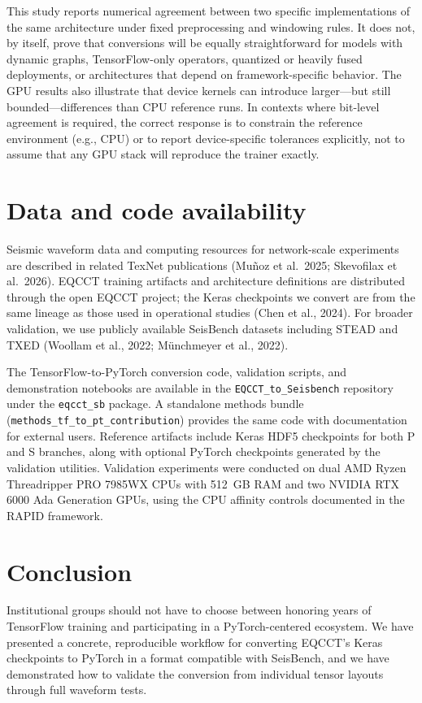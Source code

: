 This study reports numerical agreement between two specific implementations of the same architecture under fixed preprocessing and windowing rules. It does not, by itself, prove that conversions will be equally straightforward for models with dynamic graphs, TensorFlow-only operators, quantized or heavily fused deployments, or architectures that depend on framework-specific behavior. The GPU results also illustrate that device kernels can introduce larger---but still bounded---differences than CPU reference runs. In contexts where bit-level agreement is required, the correct response is to constrain the reference environment (e.g., CPU) or to report device-specific tolerances explicitly, not to assume that any GPU stack will reproduce the trainer exactly.

\section{Data and code availability}

Seismic waveform data and computing resources for network-scale experiments are described in related TexNet publications (Muñoz et al.\ 2025; Skevofilax et al.\ 2026). EQCCT training artifacts and architecture definitions are distributed through the open EQCCT project; the Keras checkpoints we convert are from the same lineage as those used in operational studies (Chen et al., 2024). For broader validation, we use publicly available SeisBench datasets including STEAD and TXED (Woollam et al., 2022; Münchmeyer et al., 2022).

The TensorFlow-to-PyTorch conversion code, validation scripts, and demonstration notebooks are available in the \texttt{EQCCT\_to\_Seisbench} repository under the \texttt{eqcct\_sb} package. A standalone methods bundle (\texttt{methods\_tf\_to\_pt\_contribution}) provides the same code with documentation for external users. Reference artifacts include Keras HDF5 checkpoints for both P and S branches, along with optional PyTorch checkpoints generated by the validation utilities. Validation experiments were conducted on dual AMD Ryzen Threadripper PRO 7985WX CPUs with 512~GB RAM and two NVIDIA RTX 6000 Ada Generation GPUs, using the CPU affinity controls documented in the RAPID framework.

\section{Conclusion}

Institutional groups should not have to choose between honoring years of TensorFlow training and participating in a PyTorch-centered ecosystem. We have presented a concrete, reproducible workflow for converting EQCCT's Keras checkpoints to PyTorch in a format compatible with SeisBench, and we have demonstrated how to validate the conversion from individual tensor layouts through full waveform tests.

